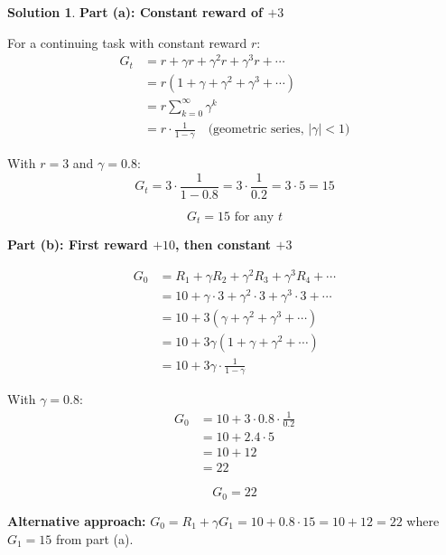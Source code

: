 \documentclass[11pt]{article}
\theoremstyle{definition}
\newtheorem*{solution}{Solution}
\begin{document}
\begin{solution}
\textbf{Part (a): Constant reward of $+3$}

For a continuing task with constant reward $r$:
\begin{align*}
G_t &= r + \gamma r + \gamma^2 r + \gamma^3 r + \cdots \\
    &= r(1 + \gamma + \gamma^2 + \gamma^3 + \cdots) \\
    &= r \sum_{k=0}^{\infty} \gamma^k \\
    &= r \cdot \frac{1}{1 - \gamma} \quad \text{(geometric series, $|\gamma| < 1$)}
\end{align*}

With $r = 3$ and $\gamma = 0.8$:
\[
G_t = 3 \cdot \frac{1}{1 - 0.8} = 3 \cdot \frac{1}{0.2} = 3 \cdot 5 = 15
\]

\[
\boxed{G_t = 15 \text{ for any } t}
\]

\textbf{Part (b): First reward $+10$, then constant $+3$}

\begin{align*}
G_0 &= R_1 + \gamma R_2 + \gamma^2 R_3 + \gamma^3 R_4 + \cdots \\
    &= 10 + \gamma \cdot 3 + \gamma^2 \cdot 3 + \gamma^3 \cdot 3 + \cdots \\
    &= 10 + 3(\gamma + \gamma^2 + \gamma^3 + \cdots) \\
    &= 10 + 3\gamma(1 + \gamma + \gamma^2 + \cdots) \\
    &= 10 + 3\gamma \cdot \frac{1}{1 - \gamma}
\end{align*}

With $\gamma = 0.8$:
\begin{align*}
G_0 &= 10 + 3 \cdot 0.8 \cdot \frac{1}{0.2} \\
    &= 10 + 2.4 \cdot 5 \\
    &= 10 + 12 \\
    &= 22
\end{align*}

\[
\boxed{G_0 = 22}
\]

\textbf{Alternative approach:} $G_0 = R_1 + \gamma G_1 = 10 + 0.8 \cdot 15 = 10 + 12 = 22$ where $G_1 = 15$ from part (a).
\end{solution}

\newpage
\end{document}
